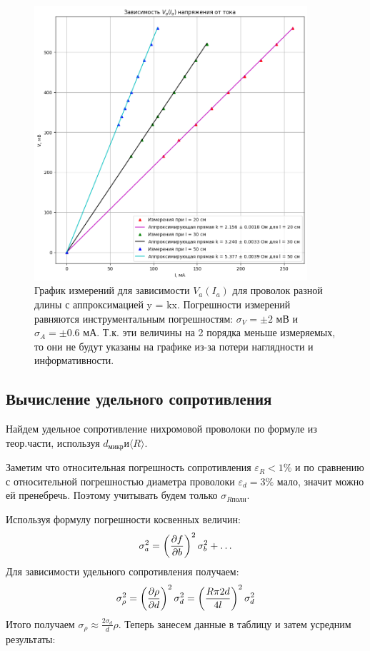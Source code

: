 \documentclass[a4paper]{article}
\begin{document}
\begin{figure}[t]
    \centering
    \includegraphics[width=0.9\textwidth]{graphic}
    \caption{График измерений для зависимости $V_{a}(I_{a})$ для проволок разной длины с аппроксимацией y = kx. Погрешности измерений равняются инструментальным погрешностям: $\sigma_{V} = \pm 2$ мВ и $\sigma_{A} = \pm 0.6$ мА. Т.к. эти величины на 2 порядка меньше измеряемых, то они не будут указаны на графике из-за потери наглядности и информативности.}
\end{figure}

\subsection{Вычисление удельного сопротивления}
Найдем удельное сопротивление нихромовой проволоки по формуле из теор.части, используя $d_{\text{микр}} \text{и} \langle R \rangle$.\par 
Заметим что относительная погрешность сопротивления $\varepsilon_{R} < 1\%$ и по сравнению с относительной погрешностью диаметра проволоки  $\varepsilon_{d} = 3\%$ мало, значит можно ей пренебречь. Поэтому учитывать будем только $\sigma_{R\text{полн}}$. \par

Используя формулу погрешности косвенных величин: \[ \sigma_{a}^2 = \left( \pdv{f}{b} \right)^2\sigma_{b}^2 + \ldots \]
Для зависимости удельного сопротивления получаем: \[ \sigma_{\rho}^2 = \left( \pdv{\rho}{d} \right)^2\sigma_{d}^2 = \left( \frac{R\pi 2d}{4l} \right)^2\sigma_{d}^2 \]
Итого получаем $\sigma_{\rho} \approx \frac{2\sigma_{d}}{d}\rho $. Теперь занесем данные в таблицу и затем усредним результаты: 
\end{document}
